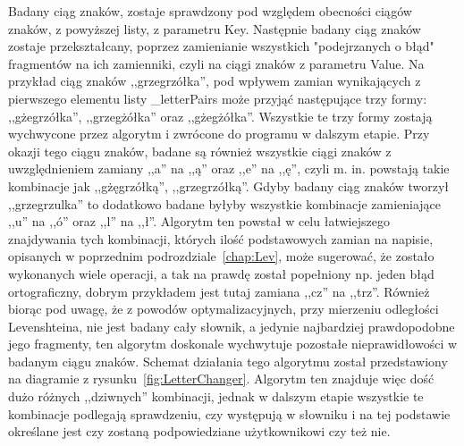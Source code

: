 \lssetdef


Badany ciąg znaków, zostaje sprawdzony pod względem obecności ciągów znaków, z powyższej listy, z parametru Key. Następnie badany ciąg znaków zostaje przekształcany, poprzez zamienianie wszystkich "podejrzanych o błąd" fragmentów na ich zamienniki, czyli na ciągi znaków z parametru Value. Na przykład ciąg znaków ,,grzegrzółka'', pod wpływem zamian wynikających z pierwszego elementu listy \_letterPairs może przyjąć następujące trzy formy: ,,gżegrzółka'', ,,grzegżółka'' oraz ,,gżegżółka''. Wszystkie te trzy formy zostają wychwycone przez algorytm i zwrócone do programu w dalszym etapie. Przy okazji tego ciągu znaków, badane są również wszystkie ciągi znaków z uwzględnieniem zamiany ,,a'' na ,,ą'' oraz ,,e'' na ,,ę'', czyli m. in. powstają takie kombinacje jak ,,gżęgrzółką'', ,,grzegrzółką''.  Gdyby badany ciąg znaków tworzył ,,grzegrzulka'' to dodatkowo badane byłyby wszystkie kombinacje zamieniające ,,u'' na ,,ó'' oraz ,,l'' na ,,ł''. Algorytm ten powstał w celu łatwiejszego znajdywania tych kombinacji, których ilość podstawowych zamian na napisie, opisanych w poprzednim podrozdziale~\ref{chap:Lev}, może sugerować, że zostało wykonanych wiele operacji, a tak na prawdę został popełniony np. jeden błąd ortograficzny, dobrym przykładem jest tutaj zamiana ,,cz'' na ,,trz''. Również biorąc pod uwagę, że z powodów optymalizacyjnych, przy mierzeniu odległości Levenshteina, nie jest badany cały słownik, a jedynie najbardziej prawdopodobne jego fragmenty, ten algorytm doskonale wychwytuje pozostałe nieprawidłowości w badanym ciągu znaków. Schemat działania tego algorytmu został przedstawiony na diagramie z rysunku~\ref{fig:LetterChanger}. Algorytm ten znajduje więc dość dużo różnych ,,dziwnych'' kombinacji, jednak w dalszym etapie wszystkie te kombinacje podlegają sprawdzeniu, czy występują w słowniku i na tej podstawie określane jest czy zostaną podpowiedziane użytkownikowi czy też nie.


